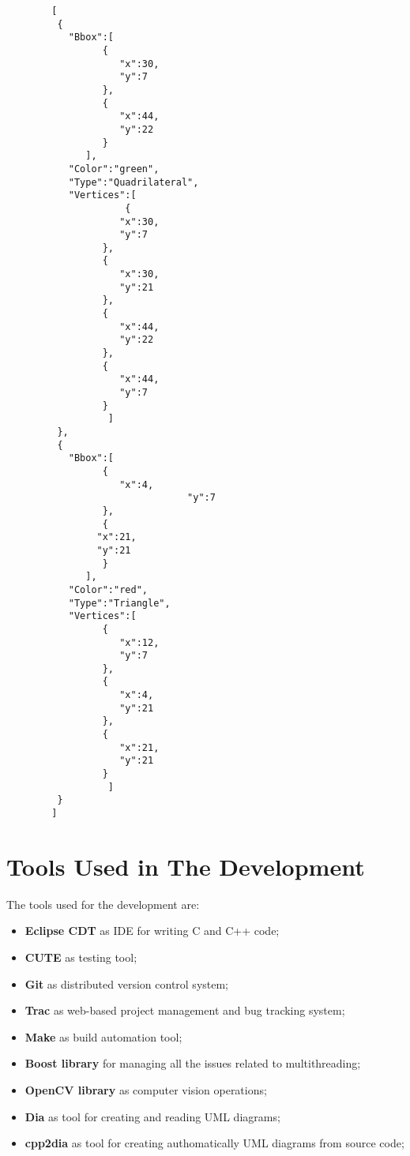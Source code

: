 		\begin{lstlisting}
		[
		 {
		   "Bbox":[
			     {
			        "x":30,
			        "y":7
			     },
			     {
			        "x":44,
			        "y":22
			     }
			  ],
		   "Color":"green",
		   "Type":"Quadrilateral",
		   "Vertices":[
			         {
				    "x":30,
				    "y":7
				 },
				 {
				    "x":30,
				    "y":21
   				 },
				 {
				    "x":44,
				    "y":22
				 },
				 {
				    "x":44,
				    "y":7
				 }
			      ]
		 },
		 {
		   "Bbox":[
			     {
			        "x":4,
                                "y":7
			     },
			     {
				"x":21,
				"y":21
			     }
			  ],
		   "Color":"red",
		   "Type":"Triangle",
		   "Vertices":[
				 {
				    "x":12,
				    "y":7
				 },
				 {
				    "x":4,
				    "y":21
 				 },
				 {
				    "x":21,
				    "y":21
				 }
			      ]
		 }
		]	
		\end{lstlisting}\label{lst:mexResp}
	

\section{Tools Used in The Development}\label{appC}	
	The tools used for the development are: 
	\begin{itemize}
	    	\item \textbf{Eclipse CDT} as IDE for writing C and C++ code;
	    	\item \textbf{CUTE} as testing tool;
		\item \textbf{Git} as distributed version control system;
		\item \textbf{Trac} as web-based project management and bug tracking system;
		\item \textbf{Make} as build automation tool;
		\item \textbf{Boost library} for managing all the issues related to multithreading;
		\item \textbf{OpenCV library} as computer vision operations;
		\item \textbf{Dia} as tool for creating and reading UML diagrams;
		\item \textbf{cpp2dia} as tool for creating authomatically UML diagrams from source code;
	\end{itemize}	





